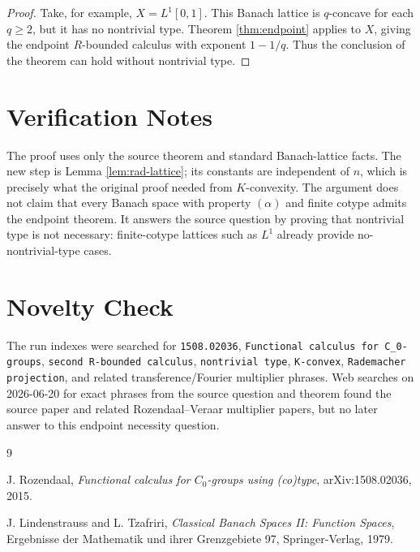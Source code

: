 \documentclass[11pt]{article}
\begin{document}
\begin{proof}
Take, for example, \(X=L^1[0,1]\).  This Banach lattice is \(q\)-concave for
each \(q\ge2\), but it has no nontrivial type.  Theorem
\ref{thm:endpoint} applies to \(X\), giving the endpoint \(R\)-bounded calculus
with exponent \(1-1/q\).  Thus the conclusion of the theorem can hold without
nontrivial type.
\end{proof}

\section*{Verification Notes}

The proof uses only the source theorem and standard Banach-lattice facts.  The
new step is Lemma \ref{lem:rad-lattice}; its constants are independent of
\(n\), which is precisely what the original proof needed from \(K\)-convexity.
The argument does not claim that every Banach space with property
\((\alpha)\) and finite cotype admits the endpoint theorem.  It answers the
source question by proving that nontrivial type is not necessary: finite-cotype
lattices such as \(L^1\) already provide no-nontrivial-type cases.

\section*{Novelty Check}

The run indexes were searched for \texttt{1508.02036}, \texttt{Functional
calculus for C\_0-groups}, \texttt{second R-bounded calculus},
\texttt{nontrivial type}, \texttt{K-convex}, \texttt{Rademacher projection},
and related transference/Fourier multiplier phrases.  Web searches on
2026-06-20 for exact phrases from the source question and theorem found the
source paper and related Rozendaal--Veraar multiplier papers, but no later
answer to this endpoint necessity question.

\begin{thebibliography}{9}

J. Rozendaal,
\emph{Functional calculus for \(C_0\)-groups using (co)type},
arXiv:1508.02036, 2015.

J. Lindenstrauss and L. Tzafriri,
\emph{Classical Banach Spaces II: Function Spaces},
Ergebnisse der Mathematik und ihrer Grenzgebiete 97,
Springer-Verlag, 1979.

\end{thebibliography}
\end{document}
